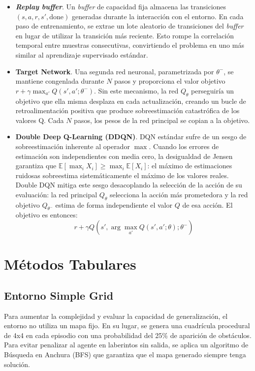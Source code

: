 \begin{itemize}
    \item \textbf{\textit{Replay buffer}}. Un \textit{buffer} \cite{mnih2015humanlevel} de capacidad fija almacena las transiciones $(s,a,r,s',\text{done})$ generadas durante la interacción con el entorno. En cada paso de entrenamiento, se extrae un lote aleatorio de transiciones del \textit{buffer} en lugar de utilizar la transición más reciente. Esto rompe la correlación temporal entre muestras consecutivas, convirtiendo el problema en uno más similar al aprendizaje supervisado estándar.

    \item \textbf{Target Network}. Una segunda red neuronal, parametrizada por $\theta^-$, se mantiene congenlada durante $N$ pasos y proporciona el valor objetivo $r + \gamma \max_{a'}Q(s',a';\theta^-)$. Sin este mecanismo, la red $Q_\theta$ perseguiría un objetivo que ella misma desplaza en cada actualización, creando un bucle de retroalimentación positiva que produce sobreestimación catastrófica de los valores Q. Cada $N$ pasos, los pesos de la red principal se copian a la objetivo.

    \item \textbf{Double Deep Q-Learning (DDQN)}. DQN estándar sufre de un sesgo de sobreestimación inherente al operador $\max$. Cuando los errores de estimación son independientes con media cero, la desigualdad de Jensen garantiza que $\mathbb{E}[\max_iX_i]\geq \max_i\mathbb{E}[X_i]$: el máximo de estimaciones ruidosas sobreestima sistemáticamente el máximo de los valores reales. Double DQN \cite{vanhasselt2016deep} mitiga este sesgo desacoplando la selección de la acción de su evaluación: la red principal $Q_\theta$ selecciona la acción más prometedora y la red objetivo $Q_{\theta^-}$ estima de forma independiente el valor $Q$ de esa acción. El objetivo es entonces:
    $$r + \gamma Q \left(s', \arg \max_{a'}Q(s',a';\theta);\theta^-\right)$$

\end{itemize}

\section{Métodos Tabulares}

\subsection{Entorno Simple Grid}

Para aumentar la complejidad y evaluar la capacidad de generalización, el entorno no utiliza un mapa fijo. En su lugar, se genera una cuadrícula procedural de 4x4 en cada episodio con una probabilidad del 25\% de aparición de obstáculos. Para evitar penalizar al agente en laberintos sin salida, se aplica un algoritmo de Búsqueda en Anchura (BFS) que garantiza que el mapa generado siempre tenga solución.

